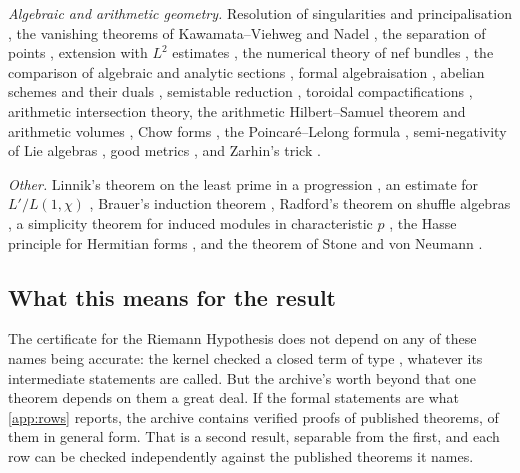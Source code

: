 \emph{Algebraic and arithmetic geometry.} Resolution of singularities and principalisation
\cite{hironaka1964resolution,kollar2007lectures}, the vanishing theorems of Kawamata--Viehweg
and Nadel \cite{kawamata1982generalization,viehweg1982vanishing,nadel1990multiplier}, the
separation of points \cite{angehrn1995effective}, extension with $L^2$ estimates
\cite{ohsawa1987extension,demailly2016extension}, the numerical theory of nef bundles
\cite{kleiman1966toward,lazarsfeld2004positivity}, the comparison of algebraic and analytic
sections \cite{serre1956geometrie}, formal algebraisation \cite{grothendieck1961elements},
abelian schemes and their duals \cite{mumford1965geometric,mumford1970abelian}, semistable
reduction \cite{grothendieck1972groupes}, toroidal compactifications
\cite{ash1975smooth,faltings1990degeneration,lan2013arithmetic,pink1989arithmetical},
arithmetic intersection theory, the arithmetic Hilbert--Samuel theorem and arithmetic volumes
\cite{gillet1990arithmetic,gillet1992arithmetic,bost1994heights,abbes1995theoreme,zhang1995positive,moriwaki2009continuity},
Chow forms \cite{chow1937algebraischen}, the Poincar\'e--Lelong formula
\cite{lelong1957integration}, semi-negativity of Lie algebras \cite{bost2004germs}, good
metrics \cite{mumford1977hirzebruch}, and Zarhin's trick \cite{zarhin1977endomorphisms}.

\emph{Other.} Linnik's theorem on the least prime in a progression
\cite{linnik1944least1,linnik1944least2}, an estimate for $L'/L(1,\chi)$
\cite{davenport1980multiplicative}, Brauer's induction theorem \cite{brauer1947artin},
Radford's theorem on shuffle algebras \cite{radford1979natural}, a simplicity theorem for
induced modules in characteristic $p$ \cite{andersen1980strong,jantzen2003representations},
the Hasse principle for Hermitian forms \cite{landherr1936aquivalenz,jacobowitz1962hermitian},
and the theorem of Stone and von Neumann \cite{stone1930linear,vonneumann1931eindeutigkeit}.

\subsection{What this means for the result}
The certificate for the Riemann Hypothesis does not depend on any of these names being
accurate: the kernel checked a closed term of type , whatever its
intermediate statements are called. But the archive's worth beyond that one theorem depends on
them a great deal. If the formal statements are what \cref{app:rows} reports, the archive
contains verified proofs of \rowspublished{} published theorems, \rowsgeneral{} of them in
general form. That is a second result, separable from the first, and each row can be checked
independently against the published theorems it names.

